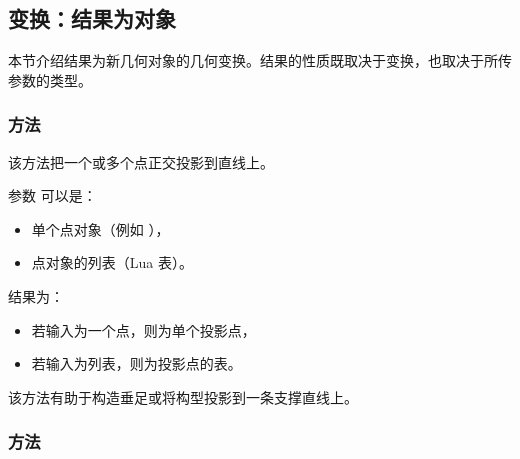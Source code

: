 \subsection{变换：结果为对象}
\label{sub:the_result_is_an_object}

本节介绍结果为新几何对象的几何变换。结果的性质既取决于变换，也取决于所传参数的类型。


\subsubsection{方法 }
\label{ssub:example_projection_of_several_points}

该方法把一个或多个点正交投影到直线上。

\medskip

参数  可以是：
\begin{itemize}
  \item 单个点对象（例如 ），
  \item 点对象的列表（Lua 表）。
\end{itemize}


结果为：
\begin{itemize}
  \item 若输入为一个点，则为单个投影点，
  \item 若输入为列表，则为投影点的表。
\end{itemize}

\medskip

该方法有助于构造垂足或将构型投影到一条支撑直线上。

\vspace{1em}

\begin{tkzexample}[latex=.5\textwidth]
\begin{center}
\end{center}
\end{tkzexample}

\subsubsection{方法 }
\label{ssub:method_line_projection__ll}

